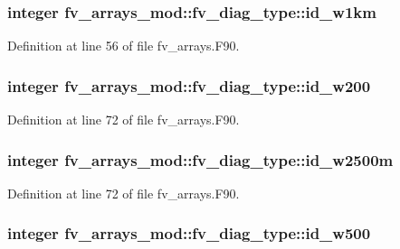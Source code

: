 \subsubsection[{id\-\_\-w1km}]{\setlength{\rightskip}{0pt plus 5cm}integer fv\-\_\-arrays\-\_\-mod\-::fv\-\_\-diag\-\_\-type\-::id\-\_\-w1km}\label{structfv__arrays__mod_1_1fv__diag__type_a5786e44912a8b47442d4585947d95435}


Definition at line 56 of file fv\-\_\-arrays.\-F90.

\subsubsection[{id\-\_\-w200}]{\setlength{\rightskip}{0pt plus 5cm}integer fv\-\_\-arrays\-\_\-mod\-::fv\-\_\-diag\-\_\-type\-::id\-\_\-w200}\label{structfv__arrays__mod_1_1fv__diag__type_ac4bd255079b0c5f4caf0c9d41ba9d3ad}


Definition at line 72 of file fv\-\_\-arrays.\-F90.

\subsubsection[{id\-\_\-w2500m}]{\setlength{\rightskip}{0pt plus 5cm}integer fv\-\_\-arrays\-\_\-mod\-::fv\-\_\-diag\-\_\-type\-::id\-\_\-w2500m}\label{structfv__arrays__mod_1_1fv__diag__type_a8d2a3ba0cfb66ff8938923fd1ba93326}


Definition at line 72 of file fv\-\_\-arrays.\-F90.

\subsubsection[{id\-\_\-w500}]{\setlength{\rightskip}{0pt plus 5cm}integer fv\-\_\-arrays\-\_\-mod\-::fv\-\_\-diag\-\_\-type\-::id\-\_\-w500}\label{structfv__arrays__mod_1_1fv__diag__type_ad73863fcb8bdc816f5a29193a8b49e1e}


